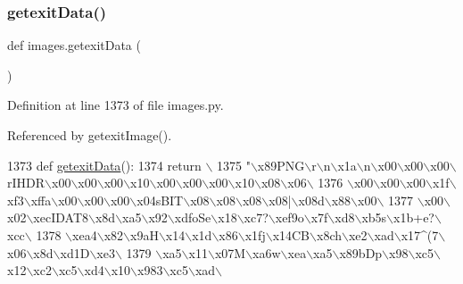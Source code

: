 \subsubsection{\texorpdfstring{getexit\+Data()}{getexitData()}}
{\footnotesize\ttfamily def images.\+getexit\+Data (\begin{DoxyParamCaption}{ }\end{DoxyParamCaption})}



Definition at line 1373 of file images.\+py.



Referenced by getexit\+Image().


\begin{DoxyCode}
1373 \textcolor{keyword}{def }\hyperlink{namespaceimages_a7e5bdbd335598e57701536741f4d8997}{getexitData}():
1374     \textcolor{keywordflow}{return} \(\backslash\)
1375 \textcolor{stringliteral}{"\(\backslash\)x89PNG\(\backslash\)r\(\backslash\)n\(\backslash\)x1a\(\backslash\)n\(\backslash\)x00\(\backslash\)x00\(\backslash\)x00\(\backslash\)rIHDR\(\backslash\)x00\(\backslash\)x00\(\backslash\)x00\(\backslash\)x10\(\backslash\)x00\(\backslash\)x00\(\backslash\)x00\(\backslash\)x10\(\backslash\)x08\(\backslash\)x06\(\backslash\)}
1376 \textcolor{stringliteral}{\(\backslash\)x00\(\backslash\)x00\(\backslash\)x00\(\backslash\)x1f\(\backslash\)xf3\(\backslash\)xffa\(\backslash\)x00\(\backslash\)x00\(\backslash\)x00\(\backslash\)x04sBIT\(\backslash\)x08\(\backslash\)x08\(\backslash\)x08\(\backslash\)x08|\(\backslash\)x08d\(\backslash\)x88\(\backslash\)x00\(\backslash\)}
1377 \textcolor{stringliteral}{\(\backslash\)x00\(\backslash\)x02\(\backslash\)xecIDAT8\(\backslash\)x8d\(\backslash\)xa5\(\backslash\)x92\(\backslash\)xdfoSe\(\backslash\)x18\(\backslash\)xc7?\(\backslash\)xef9o\(\backslash\)x7f\(\backslash\)xd8\(\backslash\)xb5s\(\backslash\)x1b+e?\(\backslash\)xcc\(\backslash\)}
1378 \textcolor{stringliteral}{\(\backslash\)xea4\(\backslash\)x82\(\backslash\)x9aH\(\backslash\)x14\(\backslash\)x1d\(\backslash\)x86\(\backslash\)x1fj\(\backslash\)x14CB\(\backslash\)x8ch\(\backslash\)xe2\(\backslash\)xad\(\backslash\)x17^(7\(\backslash\)x06\(\backslash\)x8d\(\backslash\)xd1D\(\backslash\)xe3\(\backslash\)}
1379 \textcolor{stringliteral}{\(\backslash\)xa5\(\backslash\)x11\(\backslash\)x07M\(\backslash\)xa6w\(\backslash\)xea\(\backslash\)xa5\(\backslash\)x89bDp\(\backslash\)x98\(\backslash\)xc5\(\backslash\)x12\(\backslash\)xc2\(\backslash\)xc5\(\backslash\)xd4\(\backslash\)x10\(\backslash\)x983\(\backslash\)xc5\(\backslash\)xad\(\backslash\)}

\end{DoxyCode}
